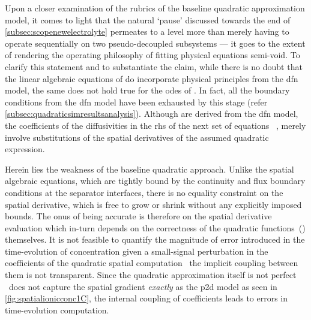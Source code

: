 Upon  a   closer  examination   of  the  rubrics   of  the   baseline  quadratic
approximation  model, it  comes  to  light that  the  natural `pause'  discussed
towards  the  end  of \cref{subsec:scopenewelectrolyte}  permeates  to  a  level
more  than  merely  having  to  operate  sequentially  on  two  pseudo-decoupled
subsystems  --- it  goes to  the extent  of rendering  the operating  philosophy
of  fitting  physical  equations  semi-void.   To  clarify  this  statement  and
to  substantiate   the  claim,  while  there   is  no  doubt  that   the  linear
algebraic   equations  of 
do    incorporate    physical    principles   from    the    \gls{dfn}    model,
the     same     does     not      hold     true     for     the     \glspl{ode}
of .   In  fact,
all   the   boundary   conditions   from   the   \gls{dfn}   model   have   been
exhausted   by  this   stage  (refer \cref{subsec:quadraticsimresultsanalysis}).
Although      are    derived
from     the      \gls{dfn}     model,      the     coefficients      of     the
diffusivities   in    the   \gls{rhs}   of    the   next   set    of   equations
\ie~,   merely
involve  substitutions  of the  spatial  derivatives  of the  assumed  quadratic
expression.

Herein lies the weakness of the  baseline quadratic approach. Unlike the spatial
algebraic equations, which are tightly bound by the continuity and flux boundary
conditions at the  separator interfaces, there is no equality  constraint on the
spatial  derivative, which  is free  to grow  or shrink  without any  explicitly
imposed  bounds.  The  onus  of  being accurate  is  therefore  on  the  spatial
derivative evaluation which in-turn depends  on the correctness of the quadratic
functions~()  themselves. It  is
not feasible to quantify the magnitude of error introduced in the time-evolution
of concentration  given a small-signal  perturbation in the coefficients  of the
quadratic spatial  computation \ie~the  implicit coupling between them  is not
transparent. Since the quadratic approximation  itself is not perfect \ie~does
not capture the  spatial gradient \emph{exactly} as the \gls{p2d}  model as seen
in \cref{fig:spatialionicconc1C}, the internal coupling of coefficients leads to
errors in time-evolution computation.

